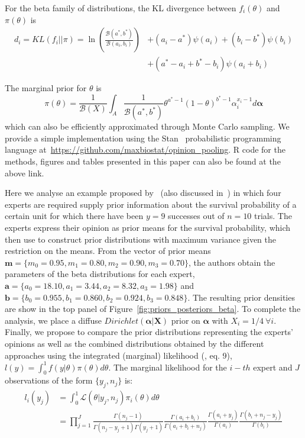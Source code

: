 \documentclass[a4paper, notitlepage, 10pt]{article}
\begin{document}
For the beta family of distributions, the KL divergence between $f_i(\theta)$ and $\pi(\theta)$ is
\begin{equation}
\begin{split}
 \label{eq:KLbeta}
 d_i = KL(f_i||\pi) = \ln\left(\frac{\mathcal{B}(a^*, b^*)}{\mathcal{B}(a_i, 
b_i)}\right) &+ (a_i-a^*)\psi(a_i)+ (b_i-b^*)\psi(b_i) \\
 &+ (a^*-a_i + b^* - b_i)\psi(a_i+b_i)
\end{split}
 \end{equation}

The marginal prior for $\theta$ is
\begin{equation}
\label{eq:marginalbeta}
\pi(\theta) = \frac{1}{\mathcal{B}(X)}\int_{A} \frac{1}{\mathcal{B}(a^*, b^*)} \theta^{a^* -1}(1-\theta)^{b^* -1}\alpha_i^{x_i-1}d\boldsymbol\alpha 
\end{equation}
which can also be efficiently approximated through Monte Carlo sampling.
We provide a simple implementation using the Stan~\citep{stan2014} probabilistic programming language at~\url{https://github.com/maxbiostat/opinion_pooling}.
R code for the methods, figures and tables presented in this paper can also be found at the above link.

Here we analyse an example proposed by~\cite{savchuk1994} (also discussed in~\cite{rufo2012B}) in which four experts are required supply prior information about the survival probability of a certain unit for which there have been $y = 9$ successes out of $n = 10$ trials.
The experts express their opinion as prior means for the survival probability, which~\cite{savchuk1994} then use to construct prior distributions with maximum variance given the restriction on the means.
From the vector of prior means $\mathbf{m} = \{ m_0 = 0.95, m_1 = 0.80, m_2 = 0.90, m_3 = 0.70 \}$, the authors obtain the parameters of the beta distributions for each expert,  $\mathbf{a} = \{ a_0 = 18.10, a_1 = 3.44 , a_2 = 8.32, a_3 = 1.98 \}$ and  $\mathbf{b} = \{ b_0 = 0.955 , b_1 = 0.860, b_2 = 0.924, b_3 = 0.848\}$.
The resulting prior densities are show in the top panel of Figure~\ref{fig:priors_posteriors_beta}.
To complete the analysis, we place a diffuse $Dirichlet(\boldsymbol\alpha | \boldsymbol X)$ prior on $\boldsymbol\alpha$ with $X_i = 1/4 \: \forall i$.
Finally, we propose to compare the prior distributions representing the experts' opinions as well as the combined distributions obtained by the different approaches using the integrated (marginal) likelihood (\cite{raftery2007}, eq. 9), $l(y) = \int_{0}^{1}f(y|\theta)\pi(\theta)d\theta$.
The marginal likelihood for the $i-th$ expert and $J$ observations of the form $\{ y_j, n_j\}$ is:
\begin{align}
  \label{eq:marglike}
l_i(y_j) &= \int_{0}^{1}\mathcal{L}(\theta|y_j, n_j)\pi_i(\theta)d\theta\nonumber\\
 &= \prod_{j = 1}^{J}\frac{\Gamma(n_j-1)}{\Gamma(n_j-y_j + 1)\Gamma(y_j+1)}\frac{\Gamma(a_i + b_i)}{\Gamma(a_i + b_i + n_j)}\frac{\Gamma(a_i + y_j)}{\Gamma(a_i)}\frac{\Gamma(b_i + n_j - y_j) }{\Gamma(b_i)}
 \end{align}
 
\end{document}
